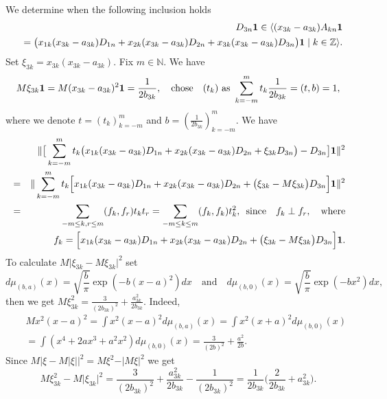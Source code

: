 \documentclass[preprint,12pt]{elsarticle}
\numberwithin{equation}{section}
\begin{document}
\begin{pf} 
We determine  when the following inclusion holds
\begin{eqnarray*}
 &&
 D_{3n}{\bf 1}\in\langle (x_{3k}-a_{3k})A_{kn}{\bf 1}\\
&&=\big(x_{1k}(x_{3k}-a_{3k})D_{1n}+x_{2k}(x_{3k}-a_{3k})D_{2n}+x_{3k}(x_{3k}-a_{3k})D_{3n}\big){\bf 1}\mid k\in {\mathbb Z}\rangle.
\end{eqnarray*}
 Set $\xi_{3k}=x_{3k}(x_{3k}-a_{3k})$. Fix $m\in {\mathbb N}$. We have 
$$M\xi_{3k}{\bf 1}=M(x_{3k}-a_{3k})^2{\bf 1}=\frac{1}{2b_{3k}},\quad\text{chose}\quad(t_k)\,\,\text{as}\,\,
\sum_{k=-m}^mt_k\frac{1}{2b_{3k}}=(t,b)=1,
$$
where we denote $t=(t_k)_{k=-m}^m$ and $b=(\frac{1}{2b_{3k}})_{k=-m}^m$. We have
%
\begin{eqnarray}
\nonumber
 &&
\Vert \big[\sum_{k=-m}^mt_k\big(x_{1k}(x_{3k}-a_{3k})D_{1n}+x_{2k}(x_{3k}-a_{3k})D_{2n}+\xi_{3k}D_{3n}\big)-D_{3n}\big]{\bf
1}\Vert^2\\
\nonumber
&=&
\Vert 
\sum_{k=-m}^mt_k\Big[
x_{1k}(x_{3k}-a_{3k})D_{1n}+x_{2k}(x_{3k}-a_{3k})D_{2n}+\big(\xi_{3k}-M\xi_{3k}\big)D_{3n}
\Big]{\bf1}
\Vert^2
\\
\label{x(3)A-norm}
&=&\sum_{-m\leq k,r\leq m}(f_k,f_r)t_kt_r=\sum_{-m\leq k\leq m}(f_k,f_k)t_k^2,\,\,\,\text{since}\quad f_k\perp f_r,\quad\text{where} \\
\nonumber
&&
f_k=\Big[
x_{1k}(x_{3k}-a_{3k})D_{1n}+x_{2k}(x_{3k}-a_{3k})D_{2n}+\big(\xi_{3k}-M\xi_{3k}\big)D_{3n}
\Big]{\bf1}.
\end{eqnarray} 
To calculate $M\vert\xi_{3k}-M\xi_{3k}\vert^2$ set
\begin{equation}
 \label{mu(b,a),mu(b,0)}
d\mu_{(b,a)}(x)=\sqrt{\frac{b}{\pi}}
\exp(-b(x-a)^2)dx\quad\text{and}\quad
d\mu_{(b,0)}(x)=\sqrt{\frac{b}{\pi}}\exp(-bx^2)dx,
\end{equation}
then we get $M\xi_{3k}^2= \frac{3}{(2b_{3k})^2}+\frac{a_{3k}^2}{2b_{3k}}$. Indeed,
\begin{eqnarray*}
 &&Mx^2(x-a)^2=\int x^2(x-a)^2d\mu_{(b,a)}(x)=\int x^2(x+a)^2d\mu_{(b,0)}(x)\\
  &&=\int (x^4+2ax^3+a^2x^2)d\mu_{(b,0)}(x)=
  \frac{3}{(2b)^2}+\frac{a^2}{2b}.
\end{eqnarray*}
Since $M\vert \xi-M\vert \xi\vert\vert^2=M \xi^2-\vert M \xi\vert^2$ 
 we get
\begin{equation*}
 M \xi_{3k}^2-M\vert \xi_{3k}\vert^2=\frac{3}{(2b_{3k})^2}+\frac{a_{3k}^2}{2b_{3k}}-\frac{1}{(2b_{3k})^2}=
\frac{1}{2b_{3k}}\Big(\frac{2}{2b_{3k}}+a_{3k}^2\Big).
\end{equation*}

\end{pf}
\end{document}

